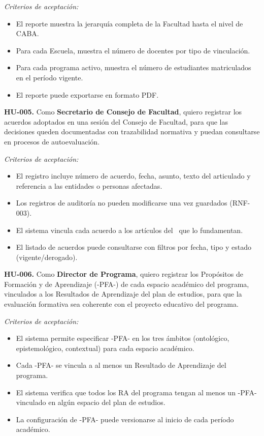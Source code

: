 \textit{Criterios de aceptación:}
\begin{itemize}
  \item El reporte muestra la jerarquía completa de la Facultad hasta el
    nivel de CABA.
  \item Para cada Escuela, muestra el número de docentes por tipo de vinculación.
  \item Para cada programa activo, muestra el número de estudiantes matriculados
    en el período vigente.
  \item El reporte puede exportarse en formato PDF.
\end{itemize}

\bigskip

\textbf{HU-005.} Como \textbf{Secretario de Consejo de Facultad}, quiero
registrar los acuerdos adoptados en una sesión del Consejo de Facultad,
para que las decisiones queden documentadas con trazabilidad normativa
y puedan consultarse en procesos de autoevaluación.

\textit{Criterios de aceptación:}
\begin{itemize}
  \item El registro incluye número de acuerdo, fecha, asunto, texto del
    articulado y referencia a las entidades o personas afectadas.
  \item Los registros de auditoría no pueden modificarse una vez guardados
    (RNF-003).
  \item El sistema vincula cada acuerdo a los artículos del \acuerdo\ que
    lo fundamentan.
  \item El listado de acuerdos puede consultarse con filtros por fecha,
    tipo y estado (vigente/derogado).
\end{itemize}

\bigskip

\textbf{HU-006.} Como \textbf{Director de Programa}, quiero registrar
los Propósitos de Formación y de Aprendizaje (-PFA-) de cada espacio
académico del programa, vinculados a los Resultados de Aprendizaje del
plan de estudios, para que la evaluación formativa sea coherente con el
proyecto educativo del programa.

\textit{Criterios de aceptación:}
\begin{itemize}
  \item El sistema permite especificar -PFA- en los tres ámbitos (ontológico,
    epistemológico, contextual) para cada espacio académico.
  \item Cada -PFA- se vincula a al menos un Resultado de Aprendizaje del programa.
  \item El sistema verifica que todos los RA del programa tengan al menos un
    -PFA- vinculado en algún espacio del plan de estudios.
  \item La configuración de -PFA- puede versionarse al inicio de cada período
    académico.
\end{itemize}


